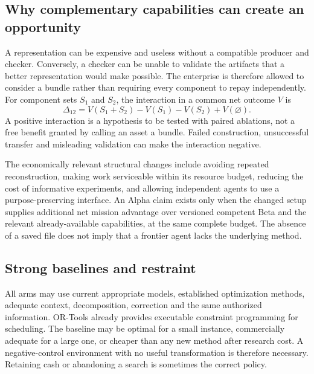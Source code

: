 \documentclass[11pt,a4paper]{article}
\begin{document}
\subsection{Why complementary capabilities can create an opportunity}

A representation can be expensive and useless without a compatible producer and checker. Conversely, a checker can be unable to validate the artifacts that a better representation would make possible. The enterprise is therefore allowed to consider a bundle rather than requiring every component to repay independently. For component sets $S_1$ and $S_2$, the interaction in a common net outcome $V$ is
\begin{equation}
  \Delta_{12}=V(S_1+S_2)-V(S_1)-V(S_2)+V(\varnothing).
\end{equation}
A positive interaction is a hypothesis to be tested with paired ablations, not a free benefit granted by calling an asset a bundle. Failed construction, unsuccessful transfer and misleading validation can make the interaction negative.

The economically relevant structural changes include avoiding repeated reconstruction, making work serviceable within its resource budget, reducing the cost of informative experiments, and allowing independent agents to use a purpose-preserving interface. An Alpha claim exists only when the changed setup supplies additional net mission advantage over versioned competent Beta and the relevant already-available capabilities, at the same complete budget. The absence of a saved file does not imply that a frontier agent lacks the underlying method.



\subsection{Strong baselines and restraint}

All arms may use current appropriate models, established optimization methods, adequate context, decomposition, correction and the same authorized information. OR-Tools already provides executable constraint programming for scheduling. The baseline may be optimal for a small instance, commercially adequate for a large one, or cheaper than any new method after research cost.\cite{ORTools} A negative-control environment with no useful transformation is therefore necessary. Retaining cash or abandoning a search is sometimes the correct policy.
\end{document}
